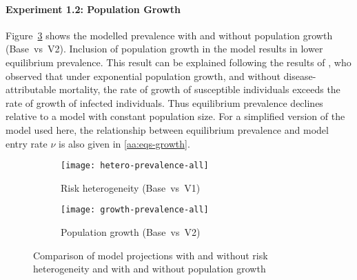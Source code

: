 \paragraph{Experiment 1.2: Population Growth}\label{p:res-1-growth}
Figure~\ref{fig:compare-growth-prevalence} shows the modelled prevalence
with and without population growth (Base~vs~V2).
Inclusion of population growth in the model
results in lower equilibrium prevalence.
This result can be explained following the results of \citet{Hadeler1990},
who observed that under exponential population growth,
and without disease-attributable mortality,
the rate of growth of susceptible individuals exceeds
the rate of growth of infected individuals.
Thus equilibrium prevalence declines
relative to a model with constant population size.
For a simplified version of the model used here,
the relationship between equilibrium prevalence and model entry rate $\nu$
is also given in \ref{aa:eqs-growth}.
\begin{figure}
  \centering
  \begin{subfigure}{0.45\linewidth}
    \centering
    \texttt{[image: hetero-prevalence-all]}
    \caption{Risk heterogeneity (Base~vs~V1)}
    \label{fig:compare-hetero-prevalence}
  \end{subfigure}
  \begin{subfigure}{0.45\linewidth}
    \centering
    \texttt{[image: growth-prevalence-all]}
    \caption{Population growth (Base~vs~V2)}
    \label{fig:compare-growth-prevalence}
  \end{subfigure}
  \caption{Comparison of model projections
    with and without risk heterogeneity and
    with and without population growth}
\end{figure}
